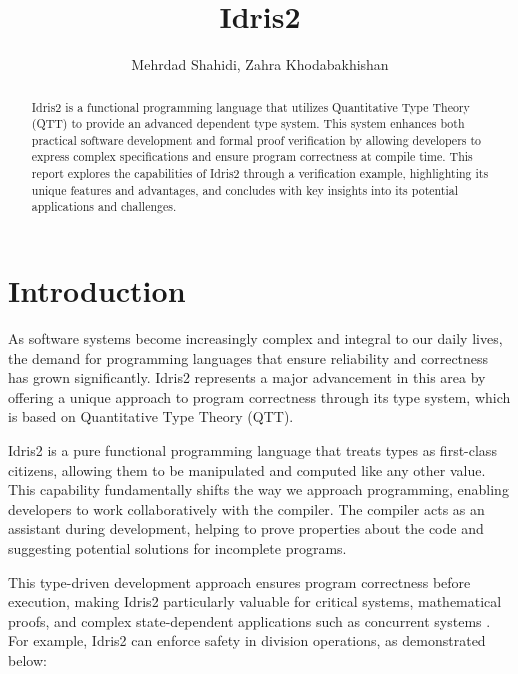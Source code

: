\documentclass[]{rptuseminar}
\title{Idris2}
\author{Mehrdad Shahidi, Zahra Khodabakhishan
  \institute{Rheinland-Pfälzische Technische Universität Kaiserslautern-Landau, Department of Computer Science}}
\begin{document}

\maketitle


\begin{abstract}
Idris2 is a functional programming language that utilizes Quantitative Type Theory (QTT) to provide an advanced dependent type system. This system enhances both practical software development and formal proof verification by allowing developers to express complex specifications and ensure program correctness at compile time. This report explores the capabilities of Idris2 through a verification example, highlighting its unique features and advantages, and concludes with key insights into its potential applications and challenges.
\end{abstract}


\section{Introduction}
\label{sec:introduction}

As software systems become increasingly complex and integral to our daily lives, the demand for programming languages that ensure reliability and correctness has grown significantly. Idris2 represents a major advancement in this area by offering a unique approach to program correctness through its type system, which is based on Quantitative Type Theory (QTT).

Idris2 is a pure functional programming language that treats types as first-class citizens, allowing them to be manipulated and computed like any other value. This capability fundamentally shifts the way we approach programming, enabling developers to work collaboratively with the compiler. The compiler acts as an assistant during development, helping to prove properties about the code and suggesting potential solutions for incomplete programs.

This type-driven development approach ensures program correctness before execution, making Idris2 particularly valuable for critical systems, mathematical proofs, and complex state-dependent applications such as concurrent systems \cite{BradyYoutube2023}. For example, Idris2 can enforce safety in division operations, as demonstrated below:
\end{document}
